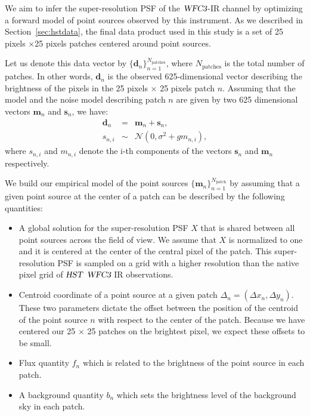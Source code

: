 \documentclass[onecolumn]{aastex61}
\newcommand{\project}[1]{{\textsl{#1}}}
\newcommand{\hst}{\project{HST}}
\newcommand{\wfc}{\project{WFC3}}
\begin{document}
We aim to infer the super-resolution PSF of the $\wfc$-IR channel by optimizing a forward model 
of point sources observed by this instrument. As we described in Section~\ref{sec:hstdata}, the final 
data product used in this study is a set of 25 pixels $\times$25 pixels patches centered around point sources. 

Let us denote this data vector by $\{\mathbf{d}_{n}\}_{n=1}^{N_\text{patches}}$, where $N_\text{patches}$ is the total number of patches. In other words, $\mathbf{d}_{n}$ is the observed 625-dimensional vector describing the brightness of the pixels in the 25 pixels $\times$ 25 pixels patch $n$. Assuming that the model and the noise model describing patch $n$ are given by two 625 dimensional vectors $\mathbf{m}_{n}$ and $\mathbf{s}_{n}$, we have:
\begin{eqnarray}
\mathbf{d}_{n} &=& \mathbf{m}_{n} + \mathbf{s}_{n}, \label{eq:model1} \\
s_{n,i} &\sim& \mathcal{N} (0 , \sigma^2 + g m_{n,i}), 
\end{eqnarray}
where $s_{n,i}$ and $m_{n,i}$ denote the i-th components of the vectors $\mathbf{s}_{n}$ and $\mathbf{m}_{n}$ respectively.

We build our empirical model of the point sources $\{\mathbf{m}_{n}\}_{n=1}^{N_\text{patch}}$ by assuming that a given point source at the center of a patch can be described by the following quantities: 

\begin{itemize}
\item A global solution for the super-resolution PSF $X$ that is shared between all point sources across the field of view. We assume 
that $X$ is normalized to one and it is centered at the center of the central pixel of the patch. This super-resolution PSF is sampled on 
a grid with a higher resolution than the native pixel grid of $\hst$ $\wfc$ IR observations.

\item Centroid coordinate of a point source at a given patch $\Delta_n = (\Delta x_n, \Delta y_n)$. 
These two parameters dictate the offset between the position of the centroid of the point source $n$ with 
respect to the center of the patch. Because we have centered our 25 $\times$ 25 patches on the brightest pixel, we expect these offsets to be small.

\item Flux quantity $f_n$ which is related to the brightness of the point source in each patch.

\item A background quantity $b_n$ which sets the brightness level of the background sky in each patch.
\end{itemize}
\end{document}

